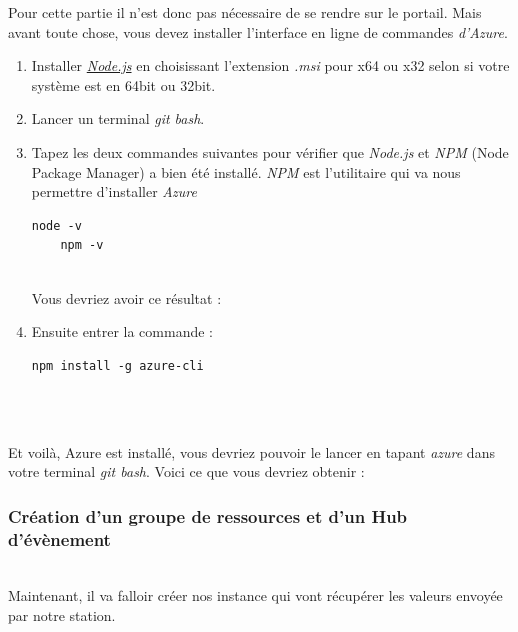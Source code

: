 Pour cette partie il n'est donc pas nécessaire de se rendre sur le portail. Mais avant toute chose, vous devez installer l'interface en ligne de commandes \textit{d'Azure}.\\

\begin{enumerate}
	\item Installer \href{https://nodejs.org/download/release/latest/}{\textit{Node.js}} en choisissant l'extension \textit{.msi} pour x64 ou x32 selon si votre système est en 64bit ou 32bit.
	\item Lancer un terminal \textit{git bash}.
	\item Tapez les deux commandes suivantes pour vérifier que \textit{Node.js}  et \textit{NPM} (Node Package Manager) a bien été installé. \textit{NPM} est l'utilitaire qui va nous permettre d'installer \textit{Azure}
	\begin{lstlisting}[style=MyBashStyle]
	node -v
	npm -v
	\end{lstlisting}\\
	Vous devriez avoir ce résultat : %
	\item Ensuite entrer la commande :
	\begin{lstlisting}[style=MyBashStyle]
	npm install -g azure-cli
	\end{lstlisting}\\
\end{enumerate}\\
Et voilà, Azure est installé, vous devriez pouvoir le lancer en tapant \textit{azure} dans votre terminal \textit{git bash}. Voici ce que vous devriez obtenir : %

\subsubsection{Création d'un groupe de ressources et d'un Hub d'évènement}\\

Maintenant, il va falloir créer nos instance qui vont récupérer les valeurs envoyée par notre station.


